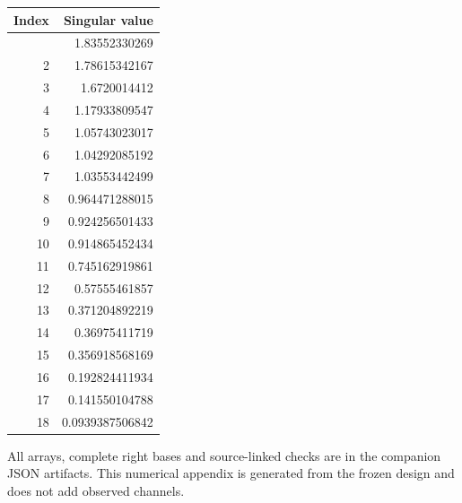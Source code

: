 \begin{longtable}[]{@{}rr@{}}
\toprule\noalign{}
Index & Singular value \\
\midrule\noalign{}
\endhead
\bottomrule\noalign{}
\endlastfoot
1 & 1.83552330269 \\
2 & 1.78615342167 \\
3 & 1.6720014412 \\
4 & 1.17933809547 \\
5 & 1.05743023017 \\
6 & 1.04292085192 \\
7 & 1.03553442499 \\
8 & 0.964471288015 \\
9 & 0.924256501433 \\
10 & 0.914865452434 \\
11 & 0.745162919861 \\
12 & 0.57555461857 \\
13 & 0.371204892219 \\
14 & 0.36975411719 \\
15 & 0.356918568169 \\
16 & 0.192824411934 \\
17 & 0.141550104788 \\
18 & 0.0939387506842 \\
\end{longtable}

All arrays, complete right bases and source-linked checks are in the companion JSON artifacts. This numerical appendix is generated from the frozen design and does not add observed channels.
